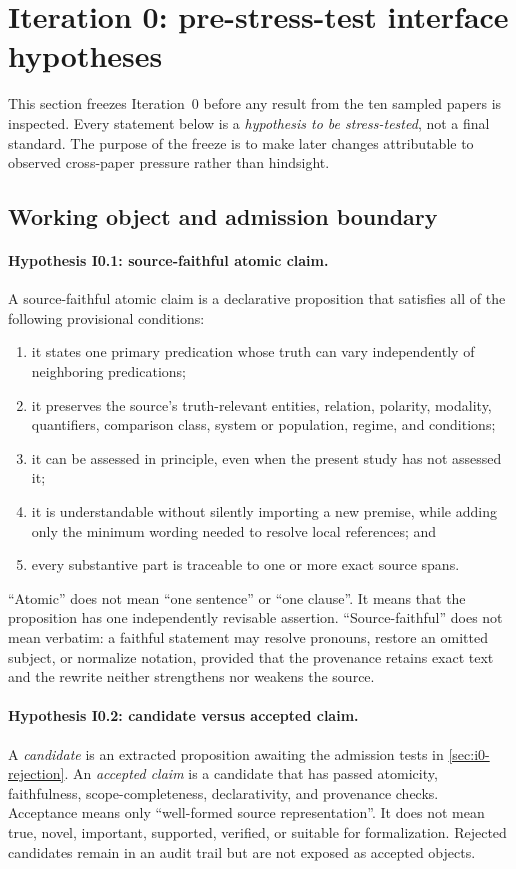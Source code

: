 \section{Iteration 0: pre-stress-test interface hypotheses}\label{sec:initial-principles}

This section freezes Iteration~0 before any result from the ten sampled papers is inspected. Every statement below is a \emph{hypothesis to be stress-tested}, not a final standard. The purpose of the freeze is to make later changes attributable to observed cross-paper pressure rather than hindsight.

\subsection{Working object and admission boundary}

\paragraph{Hypothesis I0.1: source-faithful atomic claim.}
A source-faithful atomic claim is a declarative proposition that satisfies all of the following provisional conditions:
\begin{enumerate}[label=\textup{(\alph*)}]
  \item it states one primary predication whose truth can vary independently of neighboring predications;
  \item it preserves the source's truth-relevant entities, relation, polarity, modality, quantifiers, comparison class, system or population, regime, and conditions;
  \item it can be assessed in principle, even when the present study has not assessed it;
  \item it is understandable without silently importing a new premise, while adding only the minimum wording needed to resolve local references; and
  \item every substantive part is traceable to one or more exact source spans.
\end{enumerate}
``Atomic'' does not mean ``one sentence'' or ``one clause''. It means that the proposition has one independently revisable assertion. ``Source-faithful'' does not mean verbatim: a faithful statement may resolve pronouns, restore an omitted subject, or normalize notation, provided that the provenance retains exact text and the rewrite neither strengthens nor weakens the source.

\paragraph{Hypothesis I0.2: candidate versus accepted claim.}
A \emph{candidate} is an extracted proposition awaiting the admission tests in \cref{sec:i0-rejection}. An \emph{accepted claim} is a candidate that has passed atomicity, faithfulness, scope-completeness, declarativity, and provenance checks. Acceptance means only ``well-formed source representation''. It does not mean true, novel, important, supported, verified, or suitable for formalization. Rejected candidates remain in an audit trail but are not exposed as accepted \ScientificClaim{} objects.

